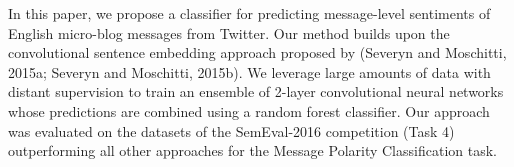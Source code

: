 In this paper, we propose a classifier for predicting message-level sentiments of English micro-blog messages from Twitter. Our method builds upon the convolutional sentence embedding approach proposed by (Severyn and Moschitti, 2015a; Severyn and Moschitti, 2015b). We leverage large amounts of data with distant supervision to train an ensemble of 2-layer convolutional neural networks whose predictions are combined using a random forest classifier. Our approach was evaluated on the datasets of the SemEval-2016 competition (Task 4) outperforming all other approaches for the Message Polarity Classification task.
